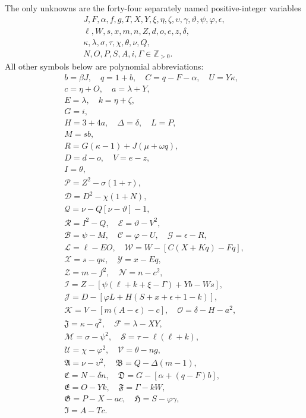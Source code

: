 The only unknowns are the forty-four separately named positive-integer variables
\[
\begin{gathered}J,F,\alpha,f,g,T,X,Y,\xi,\eta,\zeta,\upsilon,\gamma,\vartheta,\psi,\varphi,\epsilon,\\
\ell,W,s,x,m,n,Z,d,o,e,z,\delta,\\
\kappa,\lambda,\sigma,\tau,\chi,\theta,\nu,Q,\\
N,O,P,S,A,i,\Gamma\in\mathbb Z_{>0}.\end{gathered}
\]
All other symbols below are polynomial abbreviations:
\[
\begin{gathered}
b=\beta J,\quad q=1+b,\quad C=q-F-\alpha,\quad U=Y\kappa,\\
c=\eta+O,\quad a=\lambda+Y,\\
E=\lambda,\quad k=\eta+\zeta,\\
G=i,\\
H=3+4a,\quad\Delta=\delta,\quad L=P,\\
M=sb,\\
R=G(\kappa-1)+J(\mu+\omega q),\\
D=d-o,\quad V=e-z,\\
I=\theta,\\
\mathcal{P}=Z^2-\sigma(1+\tau),\\
\mathcal{D}=D^2-\chi(1+N),\\
\mathcal{Q}=\nu-Q[\nu-\vartheta]-1,\\
\mathcal{R}=I^2-Q,\quad \mathcal{E}=\vartheta-V^2,\\
\mathcal{B}=\psi-M,\quad \mathcal{C}=\varphi-U,\quad \mathcal{G}=\epsilon-R,\\
\mathcal{L}=\ell-EO,\quad \mathcal{W}=W-[C(X+Kq)-Fq],\\
\mathcal{X}=s-q\kappa,\quad \mathcal{Y}=x-Eq,\\
\mathcal{Z}=m-f^2,\quad \mathcal{N}=n-c^2,\\
\mathcal{I}=Z-[\psi(\ell+k+\xi-\Gamma)+Yb-Ws],\\
\mathcal{J}=D-[\varphi L+H(S+x+\epsilon+1-k)],\\
\mathcal{K}=V-[m(A-\epsilon)-c],\quad\mathcal{O}=\delta-H-a^2,\\
\mathfrak{J}=\kappa-q^2,\quad\mathcal{F}=\lambda-XY,\\
\mathcal{M}=\sigma-\psi^2,\quad\mathcal{S}=\tau-\ell(\ell+k),\\
\mathcal{U}=\chi-\varphi^2,\quad\mathcal{V}=\theta-ng,\\
\mathfrak{A}=\nu-\upsilon^2,\quad\mathfrak{B}=Q-\Delta(m-1),\\
\mathfrak{C}=N-\delta n,\quad\mathfrak{D}=G-[\alpha+(q-F)b],\\
\mathfrak{E}=O-Yk,\quad\mathfrak{F}=\Gamma-kW,\\
\mathfrak{G}=P-X-ac,\quad\mathfrak{H}=S-\varphi\gamma,\\
\mathfrak{I}=A-Tc.
\end{gathered}
\]
